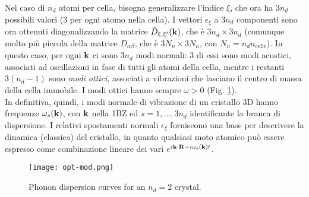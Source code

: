 Nel caso di $ n_d $ atomi per cella, bisogna generalizzare l'indice $ \xi $, che ora ha $ 3n_d $ possibili valori (3 per ogni atomo nella cella). I vettori $ \epsilon_\xi $ a $ 3n_d $ componenti sono ora ottenuti diagonalizzando la matrice $ \tilde{D}_{\xi , \xi'}(\mathbf{k}) $, che è $ 3n_d \times 3n_d $ (comunque molto più piccola della matrice $ D_{\alpha \beta} $, che è $ 3N_n \times 3N_n $, con $ N_n = n_d n_\text{celle} $). In questo caso, per ogni $ \mathbf{k} $ ci sono $ 3n_d $ modi normali: $ 3 $ di essi sono modi acustici, associati ad oscillazioni in fase di tutti gli atomi della cella, mentre i restanti $ 3(n_d - 1) $ sono \textit{modi ottici}\footnotemark, associati a vibrazioni che lasciano il centro di massa della cella immobile. I modi ottici hanno sempre $ \omega > 0 $ (Fig. \ref{op-md}). \\
In definitiva, quindi, i modi normale di vibrazione di un cristallo 3D hanno frequenze $ \omega_s(\mathbf{k}) $, con $ \mathbf{k} $ nella 1BZ ed $ s = 1, \dots, 3n_d $ identificante la branca di dispersione. I relativi spostamenti normali $ \epsilon_\xi $ forniscono una base per descrivere la dinamica (classica) del cristallo, in quanto qualsiasi moto atomico può essere espresso come combinazione lineare dei vari $ e^{i \mathbf{k} \cdot \mathbf{R} - i \omega_\text{s}(\mathbf{k}) t} $.
%

\begin{figure}
	\centering
	\texttt{[image: opt-mod.png]}
	\caption{Phonon dispersion curves for an $ n_d = 2 $ crystal.}
	\label{op-md}
\end{figure}

